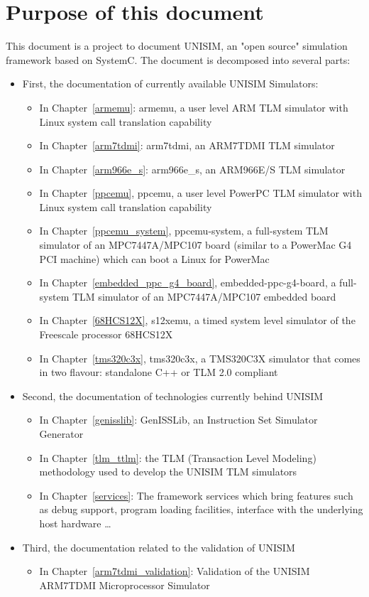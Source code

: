 \section{Purpose of this document}

This document is a project to document UNISIM, an "open source" simulation framework based on SystemC.
The document is decomposed into several parts:
\begin{itemize}
	\item First, the documentation of currently available UNISIM Simulators:
	\begin{itemize}
		\item In Chapter~\ref{armemu}: armemu, a user level ARM TLM simulator with Linux system call translation capability
		\item In Chapter~\ref{arm7tdmi}: arm7tdmi, an ARM7TDMI TLM simulator
		\item In Chapter~\ref{arm966e_s}: arm966e\_s, an ARM966E/S TLM simulator
		\item In Chapter~\ref{ppcemu}, ppcemu, a user level PowerPC TLM simulator with Linux system call translation capability
		\item In Chapter~\ref{ppcemu_system}, ppcemu-system, a full-system TLM simulator of an MPC7447A/MPC107 board (similar to a PowerMac G4 PCI machine) which can boot a Linux for PowerMac
		\item In Chapter~\ref{embedded_ppc_g4_board}, embedded-ppc-g4-board, a full-system TLM simulator of an MPC7447A/MPC107 embedded board
		\item In Chapter~\ref{68HCS12X}, s12xemu, a timed system level simulator of the Freescale processor 68HCS12X

		\item In Chapter~\ref{tms320c3x}, tms320c3x, a TMS320C3X simulator that comes in two flavour: standalone C++ or TLM 2.0 compliant
	\end{itemize}
	\item Second, the documentation of technologies currently behind UNISIM
	\begin{itemize}
		\item In Chapter~\ref{genisslib}: GenISSLib, an Instruction Set Simulator Generator
		\item In Chapter~\ref{tlm_ttlm}: the TLM (Transaction Level Modeling) methodology used to develop the UNISIM TLM simulators
		\item In Chapter~\ref{services}: The framework services which bring features such as debug support, program loading facilities, interface with the underlying host hardware \ldots
	\end{itemize}
	\item Third, the documentation related to the validation of UNISIM
	\begin{itemize}
		\item In Chapter~\ref{arm7tdmi_validation}: Validation of the UNISIM ARM7TDMI Microprocessor Simulator
	\end{itemize}
\end{itemize}

